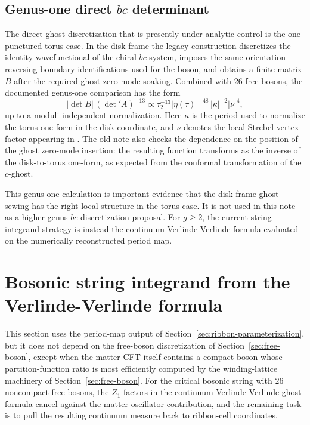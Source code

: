 \documentclass[11pt]{article}
\numberwithin{equation}{section}
\begin{document}
\subsection{\texorpdfstring{Genus-one direct \(bc\) determinant}{Genus-one direct bc determinant}}

The direct ghost discretization that is presently under analytic control is the
one-punctured torus case.  In the disk frame the legacy construction discretizes
the identity wavefunctional of the chiral \(bc\) system, imposes the same
orientation-reversing boundary identifications used for the boson, and obtains a
finite matrix \(B\) after the required ghost zero-mode soaking.  Combined with
\(26\) free bosons, the documented genus-one comparison has the form
\begin{equation}
        |\det B|\, (\det{}'A)^{-13}
        \propto
        \tau_2^{-13}|\eta(\tau)|^{-48}\,
        |\kappa|^{-2}|\nu|^4,
        \label{eq:genus1bclegacy}
\end{equation}
up to a moduli-independent normalization.  Here \(\kappa\) is the period used
to normalize the torus one-form in the disk coordinate, and \(\nu\) denotes the
local Strebel-vertex factor appearing in .  The old note
also checks the dependence on the position of the ghost zero-mode insertion:
the resulting function transforms as the inverse of the disk-to-torus
one-form, as expected from the conformal transformation of the \(c\)-ghost.

This genus-one calculation is important evidence that the disk-frame ghost
sewing has the right local structure in the torus case.  It is not used in this
note as a higher-genus \(bc\) discretization proposal.  For \(g\geq2\), the
current string-integrand strategy is instead the continuum Verlinde-Verlinde
formula evaluated on the numerically reconstructed period map.

\section{Bosonic string integrand from the Verlinde-Verlinde formula}
\label{sec:string-integrand}

This section uses the period-map output of
Section~\ref{sec:ribbon-parameterization}, but it does not depend on the
free-boson discretization of Section~\ref{sec:free-boson}, except when the
matter CFT itself
contains a compact boson whose partition-function ratio is most efficiently
computed by the winding-lattice machinery of Section~\ref{sec:free-boson}.  For
the critical bosonic string with \(26\) noncompact free bosons, the \(Z_1\)
factors in the continuum Verlinde-Verlinde ghost formula cancel against the
matter oscillator contribution, and the remaining task is to pull the resulting
continuum measure back to ribbon-cell coordinates.
\end{document}
